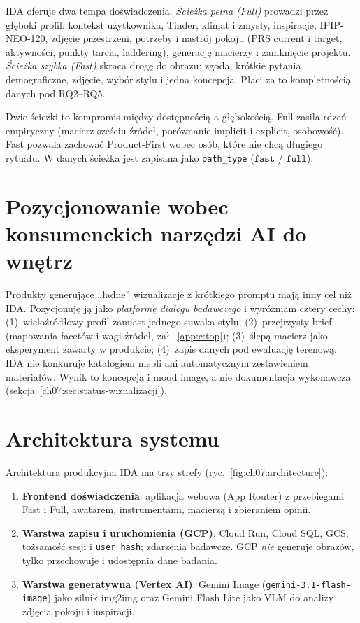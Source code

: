 IDA oferuje dwa tempa doświadczenia. \emph{Ścieżka pełna (Full)} prowadzi przez głęboki profil: kontekst użytkownika, Tinder, klimat i zmysły, inspiracje, IPIP-NEO-120, zdjęcie przestrzeni, potrzeby i nastrój pokoju (PRS current i target, aktywności, punkty tarcia, laddering), generację macierzy i zamknięcie projektu.
\emph{Ścieżka szybka (Fast)} skraca drogę do obrazu: zgoda, krótkie pytania demograficzne, zdjęcie, wybór stylu i jedna koncepcja. Płaci za to kompletnością danych pod RQ2--RQ5.

Dwie ścieżki to kompromis między dostępnością a głębokością. Full zasila rdzeń empiryczny (macierz sześciu źródeł, porównanie implicit i explicit, osobowość). Fast pozwala zachować Product-First wobec osób, które nie chcą długiego rytuału. W danych ścieżka jest zapisana jako \texttt{path\_type} ($\mathtt{fast}$ / $\mathtt{full}$).

\section{Pozycjonowanie wobec konsumenckich narzędzi AI do wnętrz}
\label{ch07:sec:pozycjonowanie}

Produkty generujące „ładne” wizualizacje z krótkiego promptu mają inny cel niż IDA. Pozycjonuję ją jako \emph{platformę dialogu badawczego} i wyróżniam cztery cechy: (1)~wieloźródłowy profil zamiast jednego suwaka stylu; (2)~przejrzysty brief (mapowania facetów i wagi źródeł, zał.~\ref{app:c:top}); (3)~ślepą macierz jako eksperyment zawarty w produkcie; (4)~zapis danych pod ewaluację terenową.
IDA nie konkuruje katalogiem mebli ani automatycznym zestawieniem materiałów. Wynik to koncepcja i mood image, a nie dokumentacja wykonawcza (sekcja~\ref{ch07:sec:status-wizualizacji}).

\section{Architektura systemu}
\label{ch07:sec:architektura}

Architektura produkcyjna IDA ma trzy strefy (ryc.~\ref{fig:ch07:architecture}):

\begin{enumerate}
  \item \textbf{Frontend doświadczenia}: aplikacja webowa (App Router) z przebiegami Fast i Full, awatarem, instrumentami, macierzą i zbieraniem opinii.
  \item \textbf{Warstwa zapisu i uruchomienia (GCP)}: Cloud Run, Cloud SQL, GCS; tożsamość sesji i \texttt{user\_hash}; zdarzenia badawcze. GCP \emph{nie} generuje obrazów, tylko przechowuje i udostępnia dane badania.
  \item \textbf{Warstwa generatywna (Vertex AI)}: Gemini Image (\texttt{gemini-3.1-flash-image}) jako silnik img2img oraz Gemini Flash Lite jako VLM do analizy zdjęcia pokoju i inspiracji.
\end{enumerate}

